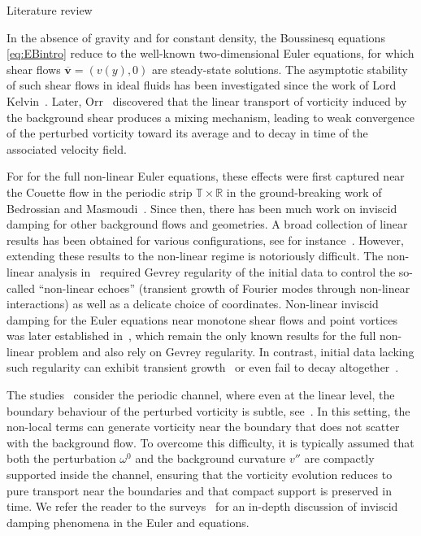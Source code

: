 \documentclass[11pt,reqno]{amsproc}
\makeatletter
\renewcommand\subsection{\@startsection{subsection}{2}%
\normalparindent{.5\linespacing\@plus.7\linespacing}{-.5em}
{\normalfont\bfseries}}
\theoremstyle{definition}
\numberwithin{equation}{section}
\newcommand{\R}{{\mathbb R}}
\newcommand{\T}{{\mathbb T}}
\renewcommand{\v}{\boldsymbol{v}}
\makeatother
\begin{document}
\subsection{Literature review}

In the absence of gravity and for constant density, the Boussinesq equations \eqref{eq:EBintro} reduce to the well-known two-dimensional Euler equations, for which shear flows $\overline{\v}=(v(y),0)$ are steady-state solutions. The asymptotic stability of such shear flows in ideal fluids has been investigated since the work of Lord Kelvin~\cite{kelvin1887stability}. Later, Orr~\cite{orr1907stability} discovered that the linear transport of vorticity induced by the background shear produces a mixing mechanism, leading to weak convergence of the perturbed vorticity toward its average and to decay in time of the associated velocity field.

For for the full non-linear Euler equations, these effects were first captured  near the Couette flow in the periodic strip $\T\times\R$ in the ground-breaking work of Bedrossian and Masmoudi~\cite{BM15}. Since then, there has been much work on inviscid damping for other background flows and geometries. A broad collection of linear results has been obtained for various configurations, see for instance~\cites{lu2024singularity, ionescu2022linear, ren2025domain, ren2023linear, ren2025linear, BCZV19, CZZ19, GNRS20, Jia20, JiaGev20, WZZ18, WZZ19, WZZKolmo20, Zillinger16, Zillinger17, ZillingerCirc17, Zillinger21}. However, extending these results to the non-linear regime is notoriously difficult. The non-linear analysis in~\cite{BM15} required Gevrey regularity of the initial data to control the so-called ``non-linear echoes'' (transient growth of Fourier modes through non-linear interactions) as well as a delicate choice of coordinates. Non-linear inviscid damping for the Euler equations near monotone shear flows and point vortices was later established in~\cite{IJ22, IJ20, IJnon20, MZ20}, which remain the only known results for the full non-linear problem and also rely on Gevrey regularity. In contrast, initial data lacking such regularity can exhibit transient growth~\cite{deng2023long} or even fail to decay altogether~\cite{lin2011inviscid, sinambela2025transition}.

The studies~\cite{IJ22, IJnon20, MZ20} consider the periodic channel, where even at the linear level, the boundary behaviour of the perturbed vorticity is subtle, see~\cite{Zillinger16, lu2024singularity}. In this setting, the non-local terms can generate vorticity near the boundary that does not scatter with the background flow. To overcome this difficulty, it is typically assumed that both the perturbation $\omega^0$ and the background curvature $v''$ are compactly supported inside the channel, ensuring that the vorticity evolution reduces to pure transport near the boundaries and that compact support is preserved in time. We refer the reader to the surveys~\cite{ionescu2022nonlinear, wei2022hydro} for an in-depth discussion of inviscid damping phenomena in the Euler and equations. 
\end{document}
